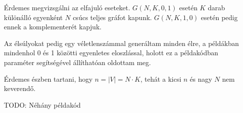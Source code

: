 Érdemes megvizsgálni az elfajuló eseteket. $G(N,K,0,1)$ esetén $K$ darab különálló egyenként $N$ csúcs teljes gráfot kapunk. $G(N,K,1,0)$ esetén pedig ennek a komplementerét kapjuk. 

Az élsúlyokat pedig egy véletlenszámmal generáltam minden élre, a példákban mindenhol 0 és 1 közötti egyenletes eloszlással, holott ez a példakódban paraméter segítségével állíthatóan oldottam meg.

Érdemes észben tartani, hogy $n=|V|=N \cdot K$, tehát a kicsi $n$ és nagy $N$ nem keverendő.

TODO: Néhány példakód

%
%
%
%
%
%
%
%
%	

